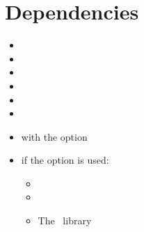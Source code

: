 \section{Dependencies}%
\begin{multicols}{2}
  \begin{itemize}[leftmargin=10pt]
    \item {}
    \item {}
    \item {}
    \item {}
    \item {}
    \item {}
    \item {} with the  option
    \item if the  option is used:
      \begin{itemize}
        \item \TikZ
        \item {}
        \item The \TikZ\ library 
      \end{itemize}
  \end{itemize}
\end{multicols}

